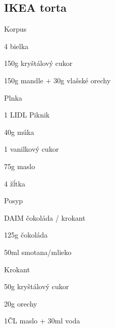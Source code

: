 \setcounter{step}{0}
\subsection{IKEA torta}

\begin{ingredient}
\begin{main}
\item
\end{main}
\begin{subingredient}{Korpus}
	\item 4 bielka
	\item 150g kryštálový cukor
	\item 150g mandle + 30g vlašské orechy
\end{subingredient}
\begin{subingredient}{Plnka}
	\item 1 LIDL Piknik
	\item 40g múka
	\item 1 vanilkový cukor
	\item 75g maslo
	\item 4 žĺtka
\end{subingredient}
\begin{subingredient}{Posyp}
	\item DAIM čokoláda / krokant
	\item 125g čokoláda
	\item 50ml smotana/mlieko
\end{subingredient}
\begin{subingredient}{Krokant}
	\item 50g kryštálový cukor
	\item 20g orechy
	\item 1ČL maslo + 30ml voda
\end{subingredient}
\end{ingredient}%
\begin{recipe}








\end{recipe}


